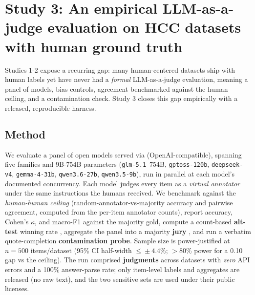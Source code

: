 \section{Study 3: An empirical LLM-as-a-judge evaluation on HCC datasets with human ground truth}
\label{sec:study3}
Studies 1-2 expose a recurring gap: many human-centered datasets ship with human labels yet have never had a
\emph{formal} LLM-as-a-judge evaluation, meaning a panel of models, bias controls, agreement benchmarked against the
human ceiling, and a contamination check. Study 3 closes this gap empirically with a released, reproducible harness.

\subsection{Method}
We evaluate a panel of \STHRmodels{} open models served via \textbf{\PROVIDER{}} (OpenAI-compatible),
spanning five families and 9B-754B parameters (\texttt{glm-5.1}~754B, \texttt{gptoss-120b}, \texttt{deepseek-v4},
\texttt{gemma-4-31b}, \texttt{qwen3.6-27b}, \texttt{qwen3.5-9b}), run in parallel at each model's documented
concurrency. Each model judges every item as a \emph{virtual annotator} under the same instructions the humans
received. We benchmark against the \emph{human-human ceiling} (random-annotator-vs-majority accuracy and pairwise
agreement, computed from the per-item annotator counts), report accuracy, Cohen's $\kappa$, and macro-F1 against the
majority gold, compute a count-based \textbf{alt-test} winning rate \citep{calderon2025alttest}, aggregate the panel
into a majority \textbf{jury} \citep{verga2024poll}, and run a verbatim quote-completion \textbf{contamination
probe}. Sample size is power-justified at $n{=}500$ items/dataset (95\% CI half-width $\le\!\pm4.4\%$; $>$80\% power
for a 0.10 gap vs the ceiling). The run comprised \textbf{\STHRn{} judgments} across \STHRdatasets{} datasets with
\emph{zero} API errors and a 100\% answer-parse rate; only item-level labels and aggregates are released (no raw
text), and the two sensitive sets are used under their public licenses.


